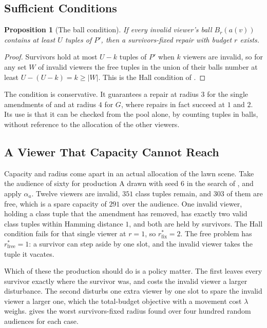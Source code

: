 \documentclass[11pt,twoside,openright]{book}
\theoremstyle{plain}
\newtheorem{proposition}[theorem]{Proposition}
\theoremstyle{definition}
\theoremstyle{remark}
\begin{document}
\subsection{Sufficient Conditions}

\begin{proposition}[The ball condition]\label{prop:ball}
If every invalid viewer's ball $B_r(a(v))$ contains at least $U$ tuples of $P'$, then a survivors-fixed repair with budget $r$ exists.
\end{proposition}

\begin{proof}
Survivors hold at most $U-k$ tuples of $P'$ when $k$ viewers are invalid, so for any set $W$ of invalid viewers the free tuples in the union of their balls number at least $U-(U-k)=k\ge\lvert W\rvert$. This is the Hall condition of .
\end{proof}

The condition is conservative. It guarantees a repair at radius $3$ for the single amendments of  and at radius $4$ for $G$, where repairs in fact succeed at $1$ and $2$. Its use is that it can be checked from the pool alone, by counting tuples in balls, without reference to the allocation of the other viewers.

\subsection{A Viewer That Capacity Cannot Reach}

Capacity and radius come apart in an actual allocation of the lawn scene. Take the audience of sixty for production A drawn with seed $6$ in the search of , and apply $\alpha_a$. Twelve viewers are invalid, $351$ class tuples remain, and $303$ of them are free, which is a spare capacity of $291$ over the audience. One invalid viewer, holding a class tuple that the amendment has removed, has exactly two valid class tuples within Hamming distance $1$, and both are held by survivors. The Hall condition fails for that single viewer at $r=1$, so $r^\ast_{\mathrm{fix}}=2$. The free problem has $r^\ast_{\mathrm{free}}=1$: a survivor can step aside by one slot, and the invalid viewer takes the tuple it vacates.

Which of these the production should do is a policy matter. The first leaves every survivor exactly where the survivor was, and costs the invalid viewer a larger disturbance. The second disturbs one extra viewer by one slot to spare the invalid viewer a larger one, which the total-budget objective with a movement cost $\lambda$ weighs.  gives the worst survivors-fixed radius found over four hundred random audiences for each case.
\end{document}
